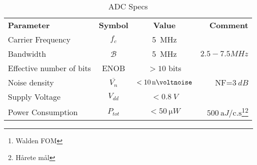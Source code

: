 \begin{table}[htbp]
  \centering
  \caption{ADC Specs}
    \begin{tabular}{lccr}
    \rowcolor[rgb]{ 0,  0,  0} \textcolor[rgb]{ 1,  1,  1}{\textbf{Parameter}}	 & \textcolor[rgb]{ 1,  1,  1}{\textbf{Symbol}}
                             & \textcolor[rgb]{ 1,  1,  1}{\textbf{Value}}       & \textcolor[rgb]{ 1,  1,  1}{\textbf{Comment}}    \\
    Carrier Frequency & $f_c$ & \SI{5}{MHz} &                                                                                        \\
    Bandwidth & $\mathcal{B}$ & \SI{5}{MHz} & $2.5-7.5\si{MHz}$                                                                      \\
    Effective number of bits & ENOB & $>10$ bits &                                                                                    \\
    Noise density   & $\overline{V_n}$ & $<\SI[per-mode=symbol]{10}{\nano\voltnoise} $ & NF=$\SI{3}{dB}$                              \\
    Supply Voltage   & $V_{dd}$ & $<\SI{0.8}{V}$ &                                                                                    \\
    Power Consumption & $P_{tot}$ & $<\SI{50}{\micro W}$ & $\SI{500}{\atto J \per\text{c.s}}$\footnote{Walden FOM}\footnote{Hårete mål}
    \end{tabular}
  \label{tab:specs_data}
\end{table}


